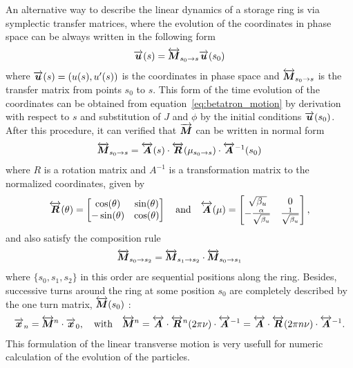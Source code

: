 	An alternative way to describe the linear dynamics of a storage ring is via symplectic transfer matrices, where the evolution of the coordinates in phase space can be always written in the following form
	\begin{align}
		\overrightarrow{\boldsymbol{u}}(s) = \overleftrightarrow{\boldsymbol{M}}_{s_0\to s} \overrightarrow{\boldsymbol{u}}(s_0)
	\end{align}
	where $\overrightarrow{\boldsymbol{u}}(s) = \left(u(s), u'(s)\right)$ is the coordinates in phase space and  $\overleftrightarrow{\boldsymbol{M}}_{s_0\to s}$ is the transfer matrix from points $s_0$ to $s$. This form of the time evolution of the coordinates can be obtained from equation~\eqref{eq:betatron_motion} by derivation with respect to $s$ and substitution of $J$ and $\phi$ by the initial conditions $\overrightarrow{\boldsymbol{u}}(s_0)$. After this procedure, it can verified that $\overrightarrow{\boldsymbol{M}}$ can be written in normal form~\cite{bengtsson}
	\begin{align}
		\overleftrightarrow{\boldsymbol{M}}_{s_0\to s} = \overleftrightarrow{\boldsymbol{A}}(s)\cdot\overleftrightarrow{\boldsymbol{R}}(\mu_{s_0\to s})\cdot\overleftrightarrow{\boldsymbol{A}}^{-1}(s_0)
	\end{align}
	where $R$ is a rotation matrix and $A^{-1}$ is a transformation matrix to the normalized coordinates, given by
	\begin{align}
		\overleftrightarrow{\boldsymbol{R}}(\theta) =
				\begin{bmatrix}
					\cos(\theta)  & \sin(\theta)\\
					-\sin(\theta) & \cos(\theta)
				\end{bmatrix}
				\quad\text{and}\quad
		\overleftrightarrow{\boldsymbol{A}}(\mu) =
				\begin{bmatrix}
					\sqrt{\beta_u}                 & 0\\
					-\frac{\alpha}{\sqrt{\beta_u}} & \frac{1}{\sqrt{\beta_u}}
				\end{bmatrix},
	\end{align}
	and also satisfy the composition rule
	\begin{align}
		\overleftrightarrow{\boldsymbol{M}}_{s_0\to s_2} = \overleftrightarrow{\boldsymbol{M}}_{s_1\to s_2}\cdot\overleftrightarrow{\boldsymbol{M}}_{s_0\to s_1}
	\end{align}
	where $\{s_0, s_1, s_2\}$ in this order are sequential positions along the ring. Besides, successive turns around the ring at some position $s_0$ are completely described by the one turn matrix, $\overleftrightarrow{\boldsymbol{M}}(s_0)$ :
	\begin{align}
		\overrightarrow{\boldsymbol{x}}_n = \overleftrightarrow{\boldsymbol{M}}^n \cdot \overrightarrow{\boldsymbol{x}}_0, \quad \text{with} \quad
		\overleftrightarrow{\boldsymbol{M}}^n = \overleftrightarrow{\boldsymbol{A}}\cdot\overleftrightarrow{\boldsymbol{R}}^n(2\pi\nu)\cdot\overleftrightarrow{\boldsymbol{A}}^{-1} =
					    \overleftrightarrow{\boldsymbol{A}}\cdot\overleftrightarrow{\boldsymbol{R}}(2\pi n \nu)\cdot\overleftrightarrow{\boldsymbol{A}}^{-1}.
	\end{align}
    This formulation of the linear transverse motion is very usefull for numeric calculation of the evolution of the particles.

